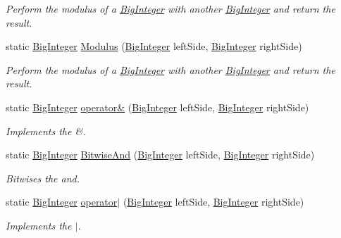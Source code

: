 \begin{DoxyCompactItemize}
\begin{DoxyCompactList}\small\item\em Perform the modulus of a \hyperlink{class_scott_garland_1_1_big_integer}{Big\+Integer} with another \hyperlink{class_scott_garland_1_1_big_integer}{Big\+Integer} and return the result. \end{DoxyCompactList}\item 
static \hyperlink{class_scott_garland_1_1_big_integer}{Big\+Integer} \hyperlink{class_scott_garland_1_1_big_integer_a99ca834445147bc4de1d108376a790c3}{Modulus} (\hyperlink{class_scott_garland_1_1_big_integer}{Big\+Integer} left\+Side, \hyperlink{class_scott_garland_1_1_big_integer}{Big\+Integer} right\+Side)
\begin{DoxyCompactList}\small\item\em Perform the modulus of a \hyperlink{class_scott_garland_1_1_big_integer}{Big\+Integer} with another \hyperlink{class_scott_garland_1_1_big_integer}{Big\+Integer} and return the result. \end{DoxyCompactList}\item 
static \hyperlink{class_scott_garland_1_1_big_integer}{Big\+Integer} \hyperlink{class_scott_garland_1_1_big_integer_a41718b5e26902e535502174c88229302}{operator\&} (\hyperlink{class_scott_garland_1_1_big_integer}{Big\+Integer} left\+Side, \hyperlink{class_scott_garland_1_1_big_integer}{Big\+Integer} right\+Side)
\begin{DoxyCompactList}\small\item\em Implements the \&. \end{DoxyCompactList}\item 
static \hyperlink{class_scott_garland_1_1_big_integer}{Big\+Integer} \hyperlink{class_scott_garland_1_1_big_integer_a05ff68999479aa04b422ddb59ea5fd61}{Bitwise\+And} (\hyperlink{class_scott_garland_1_1_big_integer}{Big\+Integer} left\+Side, \hyperlink{class_scott_garland_1_1_big_integer}{Big\+Integer} right\+Side)
\begin{DoxyCompactList}\small\item\em Bitwises the and. \end{DoxyCompactList}\item 
static \hyperlink{class_scott_garland_1_1_big_integer}{Big\+Integer} \hyperlink{class_scott_garland_1_1_big_integer_a8fb34bd1a5f4e2b8bfdf5f28dc623e63}{operator$\vert$} (\hyperlink{class_scott_garland_1_1_big_integer}{Big\+Integer} left\+Side, \hyperlink{class_scott_garland_1_1_big_integer}{Big\+Integer} right\+Side)
\begin{DoxyCompactList}\small\item\em Implements the $\vert$. \end{DoxyCompactList}\item 

\end{DoxyCompactItemize}
